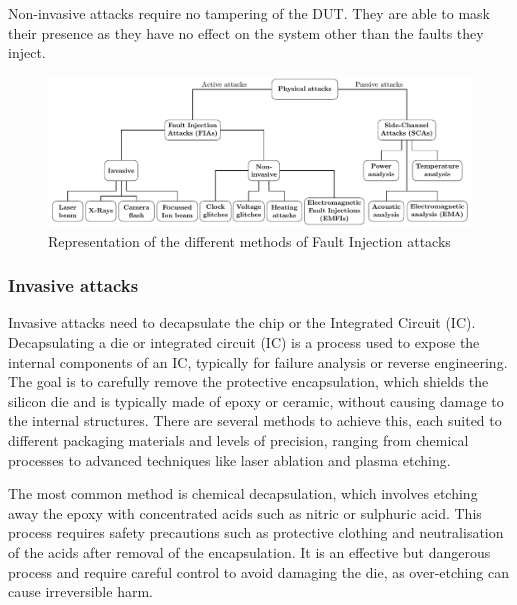 Non-invasive attacks require no tampering of the DUT. They are able to mask their presence as they have no effect on the system other than the faults they inject.


\begin{figure}[ht]
    \centering
    \includegraphics[page=2, width=.75\textwidth]{c2_soa/img/physicalAttacks.pdf}
    \caption{Representation of the different methods of Fault Injection attacks}
    \label{fig:fia}
\end{figure}

\subsubsection{Invasive attacks}
Invasive attacks need to decapsulate the chip or the Integrated Circuit (IC).
Decapsulating a die or integrated circuit (IC) is a process used to expose the internal components of an IC, typically for failure analysis or reverse engineering. The goal is to carefully remove the protective encapsulation, which shields the silicon die and is typically made of epoxy or ceramic, without causing damage to the internal structures. There are several methods to achieve this, each suited to different packaging materials and levels of precision, ranging from chemical processes to advanced techniques like laser ablation and plasma etching.

The most common method is chemical decapsulation, which involves etching away the epoxy with concentrated acids such as nitric or sulphuric acid. This process requires safety precautions such as protective clothing and neutralisation of the acids after removal of the encapsulation. It is an effective but dangerous process and require careful control to avoid damaging the die, as over-etching can cause irreversible harm.


